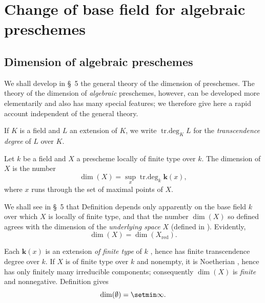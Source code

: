 \section{Change of base field for algebraic preschemes}
\label{section:IV.4}


\subsection{Dimension of algebraic preschemes}
\label{subsection:IV.4.1}

We shall develop in \S~5 the general theory of the dimension of preschemes.
The theory of the dimension of \emph{algebraic} preschemes, however, can be developed more elementarily and also has many special features; we therefore give here a rapid account independent of the general theory.

If $K$ is a field and $L$ an extension of $K$, we write $\operatorname{tr.deg}_K L$ for the \emph{transcendence degree} of $L$ over $K$.

\begin{definition}[4.1.1]
\label{IV.4.1.1}
Let $k$ be a field and $X$ a prescheme locally of finite type over $k$.
The dimension of $X$ is the number
\begin{equation}
\dim(X)=\sup_x\operatorname{tr.deg}_k\boldsymbol{k}(x),
\tag{4.1.1.1}
\label{IV.4.1.1.1}
\end{equation}
where $x$ runs through the set of maximal points of $X$.
\end{definition}

We shall see in \S~5  that Definition  depends only apparently on the base field $k$ over which $X$ is locally of finite type, and that the number $\dim(X)$ so defined agrees with the dimension of the \emph{underlying space} $X$ (defined in ).
Evidently,
\[
\dim(X)=\dim(X_{\mathrm{red}}).
\]

Each $\boldsymbol{k}(x)$ is an extension \emph{of finite type} of $k$ , hence has finite transcendence degree over $k$.
If $X$ is of finite type over $k$ and nonempty, it is Noetherian , hence has only finitely many irreducible components; consequently $\dim(X)$ is \emph{finite} and nonnegative.
Definition  gives
\[
\dim(\emptyset)=\setmin\infty.
\]

